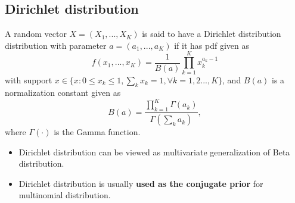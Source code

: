 \begin{refsection}
\subsection{Dirichlet distribution}
\begin{definition}\cite[49]{murphy2012machine}
	A random vector $X=(X_1,...,X_K)$ is said to have a Dirichlet distribution distribution with parameter $a=(a_1,...,a_K)$ if it has pdf given as
	$$f(x_1,...,x_K) = \frac{1}{B(a)} \prod_{k=1}^K x_k^{a_k-1}$$
	with support $x\in \{x:0\leq x_k\leq 1,\sum_k x_k = 1,\forall k=1,2...,K\}$, and $B(a)$ is a normalization constant given as
	$$B(a) = \frac{\prod_{k=1}^K \Gamma(a_k)}{\Gamma(\sum_k a_k)},$$
where $\Gamma(\cdot)$ is the Gamma function. 	
\end{definition}


\begin{remark}\hfill
\begin{itemize}
	\item Dirichlet distribution can be viewed as multivariate generalization of Beta distribution.
	\item Dirichlet distribution is usually \textbf{used as the conjugate prior} for multinomial distribution.
\end{itemize}	
\end{remark}



\end{refsection}
